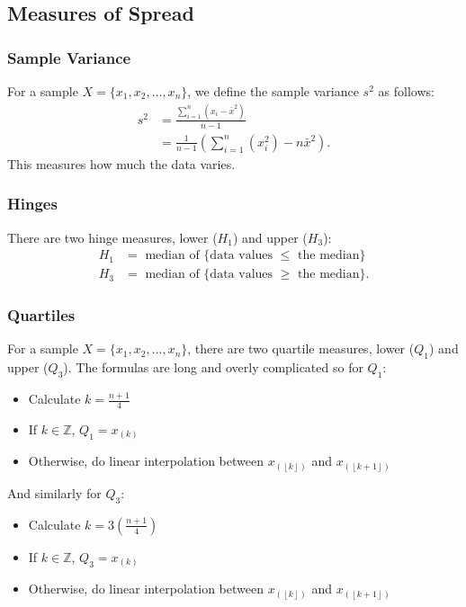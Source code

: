 \documentclass[a4paper, 12pt, twoside]{article}
\def\lf{\left\lfloor}
\def\rf{\right\rfloor}
\begin{document}
\subsection{Measures of Spread}

\subsubsection{Sample Variance}

For a sample $X = \{x_1, x_2, \ldots, x_n\}$, we define the sample
variance $s^2$ as follows:
\begin{align*}
    s^2 & = \frac{\sum_{i = 1}^n (x_i - \bar{x}^2)}{n - 1}                  \\
        & = \frac{1}{n-1}\left(\sum_{i = 1}^{n}(x_i^2) - n\bar{x}^2\right).
\end{align*}
This measures how much the data varies.

\subsubsection{Hinges}

There are two hinge measures, lower ($H_1$) and upper ($H_3$):
\begin{align*}
    H_1 & = \text{ median of \{data values } \leq \text{ the median\}}  \\
    H_3 & = \text{ median of \{data values } \geq \text{ the median\}}.
\end{align*}

\subsubsection{Quartiles}

For a sample $X = \{x_1, x_2, \ldots, x_n\}$, there are two quartile
measures, lower ($Q_1$) and upper ($Q_3$). The formulas are long and
overly complicated so for $Q_1$:

\begin{itemize}
    \item Calculate $k = \frac{n + 1}{4}$
    \item If $k \in \mathbb{Z}$, $Q_1 = x_{(k)}$
    \item Otherwise, do linear interpolation between $x_{(\lf k\rf)}$
          and $x_{(\lf k+1\rf)}$
\end{itemize}

And similarly for $Q_3$:

\begin{itemize}
    \item Calculate $k = 3\left(\frac{n + 1}{4}\right)$
    \item If $k \in \mathbb{Z}$, $Q_3 = x_{(k)}$
    \item Otherwise, do linear interpolation between $x_{(\lf k\rf)}$
          and $x_{(\lf k+1\rf)}$
\end{itemize}
\end{document}
